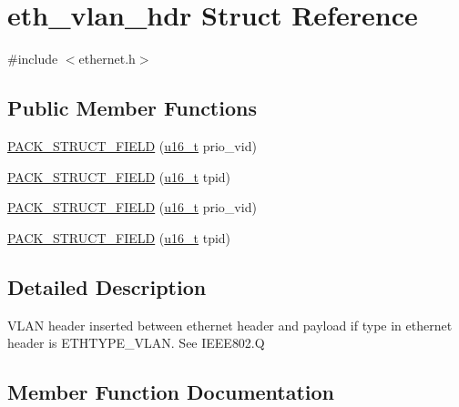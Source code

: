 \hypertarget{structeth__vlan__hdr}{}\section{eth\+\_\+vlan\+\_\+hdr Struct Reference}
\label{structeth__vlan__hdr}


{\ttfamily \#include $<$ethernet.\+h$>$}

\subsection*{Public Member Functions}
\begin{DoxyCompactItemize}
\item 
\hyperlink{structeth__vlan__hdr_a8e6e8760f4fbbab94d0ea20f38c90261}{P\+A\+C\+K\+\_\+\+S\+T\+R\+U\+C\+T\+\_\+\+F\+I\+E\+LD} (\hyperlink{group__compiler__abstraction_ga77570ac4fcab86864fa1916e55676da2}{u16\+\_\+t} prio\+\_\+vid)
\item 
\hyperlink{structeth__vlan__hdr_a580cefad860d7c3e84373236ff7f3aee}{P\+A\+C\+K\+\_\+\+S\+T\+R\+U\+C\+T\+\_\+\+F\+I\+E\+LD} (\hyperlink{group__compiler__abstraction_ga77570ac4fcab86864fa1916e55676da2}{u16\+\_\+t} tpid)
\item 
\hyperlink{structeth__vlan__hdr_a8e6e8760f4fbbab94d0ea20f38c90261}{P\+A\+C\+K\+\_\+\+S\+T\+R\+U\+C\+T\+\_\+\+F\+I\+E\+LD} (\hyperlink{group__compiler__abstraction_ga77570ac4fcab86864fa1916e55676da2}{u16\+\_\+t} prio\+\_\+vid)
\item 
\hyperlink{structeth__vlan__hdr_a580cefad860d7c3e84373236ff7f3aee}{P\+A\+C\+K\+\_\+\+S\+T\+R\+U\+C\+T\+\_\+\+F\+I\+E\+LD} (\hyperlink{group__compiler__abstraction_ga77570ac4fcab86864fa1916e55676da2}{u16\+\_\+t} tpid)
\end{DoxyCompactItemize}


\subsection{Detailed Description}
V\+L\+AN header inserted between ethernet header and payload if \textquotesingle{}type\textquotesingle{} in ethernet header is E\+T\+H\+T\+Y\+P\+E\+\_\+\+V\+L\+AN. See I\+E\+E\+E802.\+Q 

\subsection{Member Function Documentation}
\mbox{\label{structeth__vlan__hdr_a8e6e8760f4fbbab94d0ea20f38c90261}} 
